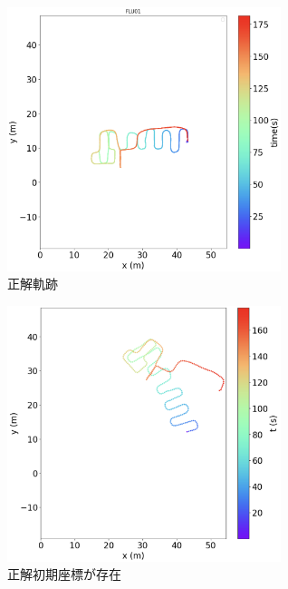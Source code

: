 \begin{figure}[ht]
	\centering
	\includegraphics[width=80mm]{image/gt2.jpg}
	\caption{正解軌跡}    \label{fig:gt-trajectory}
\end{figure}

\begin{figure}[ht]
	\centering
	\includegraphics[width=80mm]{image/pdr-move.jpg}
	\caption{正解初期座標が存在}    \label{fig:pdr-move}
\end{figure}





